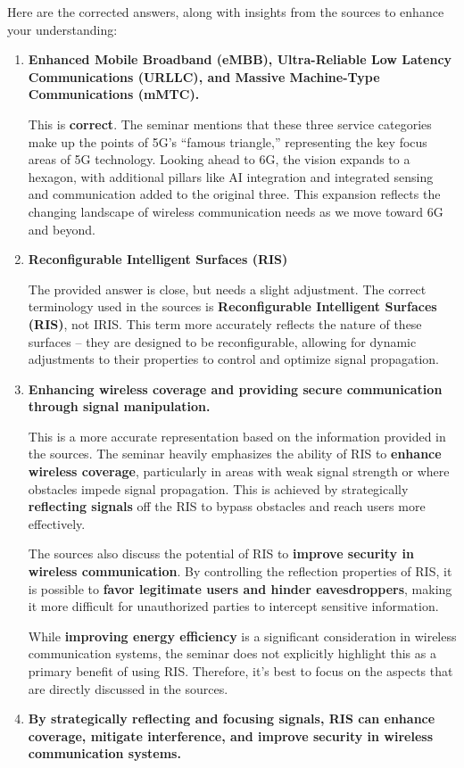 \documentclass[
]{article}
\author{}
\date{}
\begin{document}
Here are the corrected answers, along with insights from the sources to
enhance your understanding:

\begin{enumerate}
\def\labelenumi{\arabic{enumi}.}
\item
  \textbf{Enhanced Mobile Broadband (eMBB), Ultra-Reliable Low Latency
  Communications (URLLC), and Massive Machine-Type Communications
  (mMTC).}

  This is \textbf{correct}. The seminar mentions that these three
  service categories make up the points of 5G's ``famous triangle,''
  representing the key focus areas of 5G technology. Looking ahead to
  6G, the vision expands to a hexagon, with additional pillars like AI
  integration and integrated sensing and communication added to the
  original three. This expansion reflects the changing landscape of
  wireless communication needs as we move toward 6G and beyond.
\item
  \textbf{Reconfigurable Intelligent Surfaces (RIS)}

  The provided answer is close, but needs a slight adjustment. The
  correct terminology used in the sources is \textbf{Reconfigurable
  Intelligent Surfaces (RIS)}, not IRIS. This term more accurately
  reflects the nature of these surfaces -- they are designed to be
  reconfigurable, allowing for dynamic adjustments to their properties
  to control and optimize signal propagation.
\item
  \textbf{Enhancing wireless coverage and providing secure communication
  through signal manipulation.}

  This is a more accurate representation based on the information
  provided in the sources. The seminar heavily emphasizes the ability of
  RIS to \textbf{enhance wireless coverage}, particularly in areas with
  weak signal strength or where obstacles impede signal propagation.
  This is achieved by strategically \textbf{reflecting signals} off the
  RIS to bypass obstacles and reach users more effectively.

  The sources also discuss the potential of RIS to \textbf{improve
  security in wireless communication}. By controlling the reflection
  properties of RIS, it is possible to \textbf{favor legitimate users
  and hinder eavesdroppers}, making it more difficult for unauthorized
  parties to intercept sensitive information.

  While \textbf{improving energy efficiency} is a significant
  consideration in wireless communication systems, the seminar does not
  explicitly highlight this as a primary benefit of using RIS.
  Therefore, it's best to focus on the aspects that are directly
  discussed in the sources.
\item
  \textbf{By strategically reflecting and focusing signals, RIS can
  enhance coverage, mitigate interference, and improve security in
  wireless communication systems.}


\end{enumerate}
\end{document}
